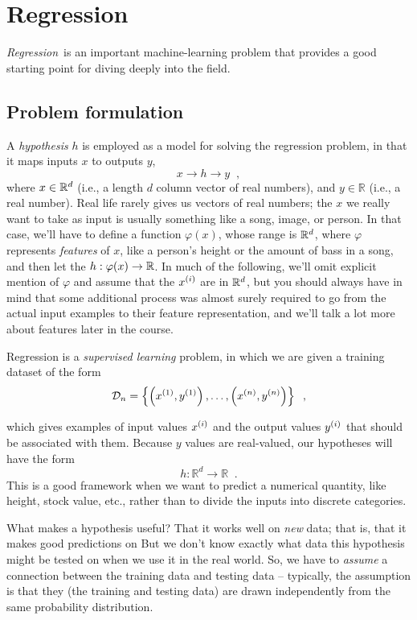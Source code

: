 \chapter{Regression}
\label{chap-regression}

{\em Regression}\ is an important %
machine-learning problem that provides a good starting point for
diving deeply into the field.

\section{Problem formulation}

A {\em hypothesis} $h$ is employed as a
model for solving the regression problem, in that it maps inputs $x$
to outputs $y$,
$$ x \rightarrow \boxed{h} \rightarrow y \;\;,$$
where $x \in \mathbb{R}^d$ (i.e., a length $d$ column vector of real numbers),
and $y \in \mathbb{R}$ (i.e., a real number).
Real life rarely gives us vectors of real numbers;  the $x$ we really
want to take as input is usually something like a song, image, or person.
In that case, we'll have to define a function $\varphi(x)$, whose
range is $\mathbb{R}^d$, where $\varphi$ represents
  {\em features} of $x$, like a person's height or the amount of bass in
a song, and then let the $h: \varphi(x) \rightarrow \mathbb{R}$.
In much of the following, we'll omit explicit mention of $\varphi$ and
assume that the $x^{(i)}$ are in $\mathbb{R}^d$, but you should always have
in mind that some additional process was almost surely required to go
from the actual input examples to their feature representation, and
we'll talk a lot more about features later in the course.

Regression is a {\em supervised learning} problem, in which we are given a training dataset of the form
$$
  {\cal D}_n = \left\{\left(x^{(1)}, y^{(1)}\right), \dots,
  \left(x^{(n)}, y^{(n)}\right)\right\}\;\;,
$$

which gives examples of input values $x^{(i)}$ and the output values
$y^{(i)}$ that should be associated with them.
Because $y$ values are real-valued, our hypotheses will have the form
$$ h: \mathbb{R}^d \rightarrow \mathbb{R} \;\;.$$
This is a good framework when we want to predict a numerical quantity,
like height, stock value, etc., rather than to divide the inputs into
discrete categories.

What makes a hypothesis useful? That it works well on {\em new} data;
that is, that it makes good predictions on
But we don't know exactly what data this hypothesis might be tested on
when we use it in the real world. So, we have to {\em{assume}} a
connection between the training data and testing data -- typically, the assumption is that
they (the training and testing data) are drawn independently from the same probability distribution.

